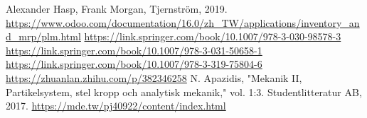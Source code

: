 \newpage
\renewcommand\bibname{參~考~文~獻}
\begin{thebibliography}{99}  %

 Alexander Hasp, Frank Morgan, Tjernström, 2019. 
 \url{https://www.odoo.com/documentation/16.0/zh_TW/applications/inventory_and_mrp/plm.html}
 \url{https://link.springer.com/book/10.1007/978-3-030-98578-3}
 \url{https://link.springer.com/book/10.1007/978-3-031-50658-1}
 \url{https://link.springer.com/book/10.1007/978-3-319-75804-6}
 \url{https://zhuanlan.zhihu.com/p/382346258}
 N. Apazidis, "Mekanik II, Partikelsystem, stel kropp och analytisk mekanik," vol. 1:3. Studentlitteratur AB, 2017.
 \url{https://mde.tw/pj40922/content/index.html}

\end{thebibliography}
\newpage
